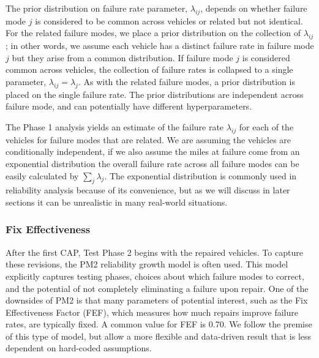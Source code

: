 \documentclass[12pt]{article}
\begin{document}
The prior distribution on failure rate parameter, $\lambda_{ij}$, depends on
whether failure mode $j$ is considered to be common across vehicles or related
but not identical. For the related failure modes, we place a prior distribution
on the collection of $\lambda_{ij}$; in other words, we assume each vehicle has
a distinct failure rate in failure mode $j$ but they arise from a common
distribution.  If failure mode $j$ is considered common across vehicles, the collection of
failure rates is collapsed to a single parameter, $\lambda_{ij} = \lambda_j$. As
with the related failure modes, a prior distribution is placed on the single
failure rate. The prior distributions are independent across failure mode, and
can potentially have different hyperparameters.

The Phase 1 analysis yields an estimate of the failure rate $\lambda_{ij}$ for
each of the vehicles for failure modes that are related.  We are assuming the
vehicles are conditionally independent, if we also assume the miles at failure
come from an exponential distribution the overall failure rate across all
failure modes can be easily calculated by $\sum_{j}\lambda_{j}$.  The
exponential distribution is commonly used in reliability analysis because of its
convenience, but as we will discuss in later sections it can be unrealistic in
many real-world situations.

\subsubsection{Fix Effectiveness}
After the first CAP, Test Phase 2 begins with the repaired vehicles. To capture
these revisions, the PM2 reliability growth model \cite{EH06} is often used.
This model explicitly captures testing phases, choices about which failure modes
to correct, and the potential of not completely eliminating a failure upon
repair. One of the downsides of PM2 is that many parameters of potential
interest, such as the Fix Effectiveness Factor (FEF), which measures how much
repairs improve failure rates, are typically fixed. A common value for FEF is
0.70. We follow the premise of this type of model, but allow a more flexible and
data-driven result that is less dependent on hard-coded assumptions.
\end{document}
